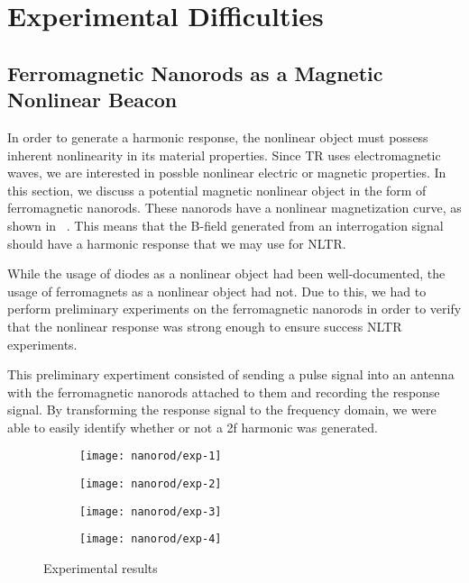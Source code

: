 \section{Experimental Difficulties}
\label{sec:nltr-expr-diff}

\subsection{Ferromagnetic Nanorods as a Magnetic Nonlinear Beacon}

In order to generate a harmonic response, the nonlinear object must possess inherent nonlinearity in its material properties. Since TR uses electromagnetic waves, we are interested in possble nonlinear electric or magnetic properties. In this section, we discuss a potential magnetic nonlinear object in the form of ferromagnetic nanorods. These nanorods have a nonlinear magnetization curve, as shown in ~. This means that the B-field generated from an interrogation signal should have a harmonic response that we may use for NLTR. 

While the usage of diodes as a nonlinear object had been well-documented, the usage of ferromagnets as a nonlinear object had not. Due to this, we had to perform preliminary experiments on the ferromagnetic nanorods in order to verify that the nonlinear response was strong enough to ensure success NLTR experiments. 

This preliminary expertiment consisted of sending a pulse signal into an antenna with the ferromagnetic nanorods attached to them and recording the response signal. By transforming the response signal to the frequency domain, we were able to easily identify whether or not a 2f harmonic was generated. 
 
 \begin{figure}[h!]
     \centering
     \begin{subfigure}{0.45\textwidth}
         \centering
         \texttt{[image: nanorod/exp-1]}
         \caption[]{}
         \label{fig:nanorod-exp-1}
     \end{subfigure}
         \begin{subfigure}{0.45\textwidth}
         \centering
         \texttt{[image: nanorod/exp-2]}
         \caption[]{}
         \label{fig:nanorod-exp-2}
     \end{subfigure}
         \begin{subfigure}{0.45\textwidth}
         \centering
         \texttt{[image: nanorod/exp-3]}
         \caption[]{}
         \label{fig:nanorod-exp-3}
     \end{subfigure}
         \begin{subfigure}{0.45\textwidth}
         \centering
         \texttt{[image: nanorod/exp-4]}
         \caption[]{}
         \label{fig:nanorod-exp-4}
     \end{subfigure}
     \caption[Ferromagnetic nanorod experimental results]{Experimental results}
     \label{fig:nanorod-results}
 \end{figure}
 
